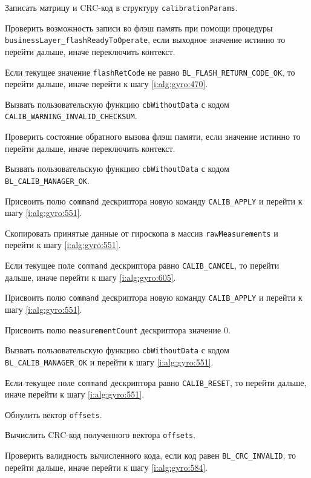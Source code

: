 \begin{enumerate_step}
    \item \label{i:alg:gyro:584} Записать матрицу и CRC-код в структуру \lstinline|calibrationParams|.
    \item Проверить возможность записи во флэш память при помощи процедуры \lstinline|businessLayer_flashReadyToOperate|, если выходное значение истинно то перейти дальше, иначе переключить контекст.
    \item Если текущее значение \lstinline|flashRetCode| не равно \lstinline|BL_FLASH_RETURN_CODE_OK|, то перейти дальше, иначе перейти к шагу
    \ref{i:alg:gyro:470}.
    \item Вызвать пользовательскую функцию \lstinline|cbWithoutData| с кодом \lstinline|CALIB_WARNING_INVALID_CHECKSUM|.
    \item \label{i:alg:gyro:470} Проверить состояние обратного вызова флэш памяти, если значение истинно то перейти дальше, иначе переключить контекст.
    \item Вызвать пользовательскую функцию \lstinline|cbWithoutData| с кодом \lstinline|BL_CALIB_MANAGER_OK|.
    \item Присвоить полю \lstinline|command| дескриптора  новую команду \lstinline|CALIB_APPLY| и перейти к шагу \ref{i:alg:gyro:551}.

    \item \label{i:alg:gyro:591} Скопировать принятые данные от гироскопа в массив \lstinline|rawMeasurements| и перейти к шагу \ref{i:alg:gyro:551}.

    \item \label{i:alg:gyro:599} Если текущее поле \lstinline|command| дескриптора равно \lstinline|CALIB_CANCEL|, то перейти дальше, иначе перейти к шагу
    \ref{i:alg:gyro:605}.
    \item Присвоить полю \lstinline|command| дескриптора  новую команду \lstinline|CALIB_APPLY| и перейти к шагу \ref{i:alg:gyro:551}.
    \item Присвоить полю \lstinline|measurementCount| дескриптора значение 0.
    \item Вызвать пользовательскую функцию \lstinline|cbWithoutData| с кодом \lstinline|BL_CALIB_MANAGER_OK| и перейти к шагу \ref{i:alg:gyro:551}.
 
    \item \label{i:alg:gyro:605} Если текущее поле \lstinline|command| дескриптора равно \lstinline|CALIB_RESET|, то перейти дальше, иначе перейти к шагу
    \ref{i:alg:gyro:551}.
    \item Обнулить вектор \lstinline|offsets|.
    \item Вычислить CRC-код полученного вектора \lstinline|offsets|.
    \item Проверить валидность вычисленного кода, если код равен \lstinline|BL_CRC_INVALID|, то перейти дальше, иначе перейти к шагу \ref{i:alg:gyro:584}.

\end{enumerate_step}

